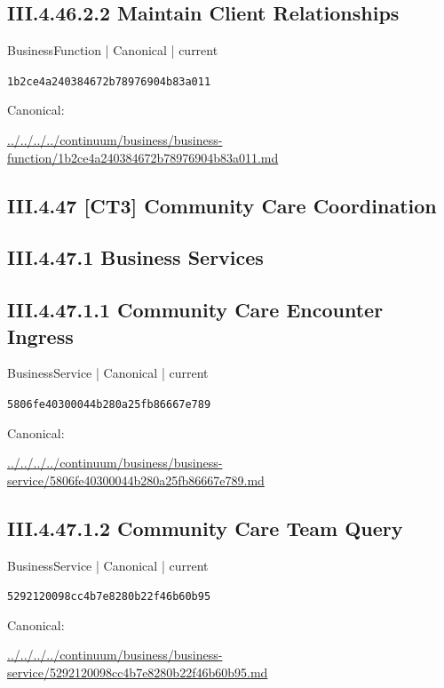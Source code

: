 \documentclass[10pt,a4paper]{article}
\begin{document}
\subsection*{III.4.46.2.2 Maintain Client Relationships}
{\small BusinessFunction | Canonical | current}\par
\texttt{1b2ce4a240384672b78976904b83a011}\par
Canonical: \par
{\footnotesize\url{../../../../continuum/business/business-function/1b2ce4a240384672b78976904b83a011.md}}\par
\subsection*{III.4.47 [CT3] Community Care Coordination}
\subsection*{III.4.47.1 Business Services}
\subsection*{III.4.47.1.1 Community Care Encounter Ingress}
{\small BusinessService | Canonical | current}\par
\texttt{5806fe40300044b280a25fb86667e789}\par
Canonical: \par
{\footnotesize\url{../../../../continuum/business/business-service/5806fe40300044b280a25fb86667e789.md}}\par
\subsection*{III.4.47.1.2 Community Care Team Query}
{\small BusinessService | Canonical | current}\par
\texttt{5292120098cc4b7e8280b22f46b60b95}\par
Canonical: \par
{\footnotesize\url{../../../../continuum/business/business-service/5292120098cc4b7e8280b22f46b60b95.md}}\par
\end{document}
